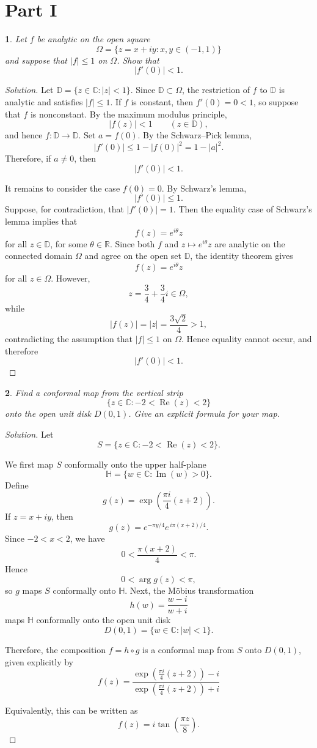 \documentclass[12pt, a4paper]{report}
\theoremstyle{spaced}
\newtheorem{exercise}{}
\begin{document}
\section{Part I}
\begin{exercise}
	Let \(f\) be analytic on the open square
	\[
		\Omega=\{z=x+iy:x,y\in(-1,1)\}
	\]
	and suppose that \(|f|\leq 1\) on \(\Omega\). Show that
	\[
		|f'(0)|<1.
	\]
\end{exercise}
\begin{proof}[Solution]
	Let $\mathbb{D}=\{z\in\mathbb{C}:|z|<1\}$. Since $\mathbb{D}\subset\Omega$, the restriction of $f$ to $\mathbb{D}$ is analytic and satisfies $|f|\leq 1$.
	If $f$ is constant, then $f'(0)=0<1$, so suppose that $f$ is nonconstant. By the maximum modulus principle,
	\[
		|f(z)|<1 \qquad (z\in\mathbb{D}),
	\]
	and hence $f:\mathbb{D}\to\mathbb{D}$.
	Set $a=f(0)$. By the Schwarz--Pick lemma,
	\[
		|f'(0)|\leq 1-|f(0)|^2=1-|a|^2.
	\]
	Therefore, if $a\neq 0$, then
	\[
		|f'(0)|<1.
	\]

	It remains to consider the case $f(0)=0$. By Schwarz's lemma,
	\[
		|f'(0)|\leq 1.
	\]
	Suppose, for contradiction, that $|f'(0)|=1$. Then the equality case of Schwarz's lemma implies that
	\[
		f(z)=e^{i\theta}z
	\]
	for all $z\in\mathbb{D}$, for some $\theta\in\mathbb{R}$.
	Since both $f$ and $z\mapsto e^{i\theta}z$ are analytic on the connected domain $\Omega$ and agree on the open set $\mathbb{D}$, the identity theorem gives
	\[
		f(z)=e^{i\theta}z
	\]
	for all $z\in\Omega$.
	However,
	\[
		z=\frac34+\frac34 i\in\Omega,
	\]
	while
	\[
		|f(z)|=|z|
		=\frac{3\sqrt{2}}{4}>1,
	\]
	contradicting the assumption that $|f|\leq 1$ on $\Omega$.
	Hence equality cannot occur, and therefore
	\[
		|f'(0)|<1.
	\]
\end{proof}

\begin{exercise}
	Find a conformal map from the vertical strip
	\[
		\{z\in\mathbb{C}:-2<\operatorname{Re}(z)<2\}
	\]
	onto the open unit disk \(D(0,1)\). Give an explicit formula for your map.
\end{exercise}
\begin{proof}[Solution]
	Let
	\[
		S=\{z\in\mathbb{C}:-2<\operatorname{Re}(z)<2\}.
	\]

	We first map $S$ conformally onto the upper half-plane
	\[
		\mathbb{H}=\{w\in\mathbb{C}:\operatorname{Im}(w)>0\}.
	\]
	Define
	\[
		g(z)=\exp\left(\frac{\pi i}{4}(z+2)\right).
	\]
	If $z=x+iy$, then
	\[
		g(z)
		=
		e^{-\pi y/4}e^{\,i\pi(x+2)/4}.
	\]
	Since $-2<x<2$, we have
	\[
		0<\frac{\pi(x+2)}{4}<\pi.
	\]
	Hence
	\[
		0<\arg g(z)<\pi,
	\]
	so $g$ maps $S$ conformally onto $\mathbb{H}$.
	Next, the Möbius transformation
	\[
		h(w)=\frac{w-i}{w+i}
	\]
	maps $\mathbb{H}$ conformally onto the open unit disk
	\[
		D(0,1)=\{w\in\mathbb{C}:|w|<1\}.
	\]

	Therefore, the composition $f=h\circ g$ is a conformal map from $S$
	onto $D(0,1)$, given explicitly by
	\[
		f(z)=
		\frac{
			\exp\left(\frac{\pi i}{4}(z+2)\right)-i
		}{
			\exp\left(\frac{\pi i}{4}(z+2)\right)+i
		}
	\]

	Equivalently, this can be written as
	\[
		f(z)=i\tan\left(\frac{\pi z}{8}\right).
	\]
\end{proof}
\end{document}
